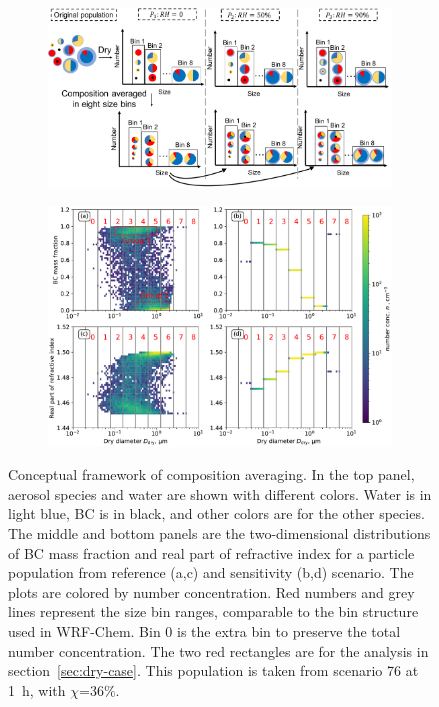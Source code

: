\documentclass[edeposit,fullpage]{uiucthesis2009}
\begin{document}
\begin{figure}
\centering
\begin{subfigure}{0.8\textwidth}
\includegraphics[scale=0.45]{chap4_figs/fig1.pdf}
\end{subfigure}
\begin{subfigure}{0.8\textwidth}
\includegraphics[scale=0.56]{chap4_figs/fig2.pdf}
\end{subfigure}
\caption{Conceptual framework of composition averaging. In the top
  panel, aerosol species and water are shown with different
  colors. Water is in light blue, BC is in black, and other colors are
  for the other species. The middle and bottom panels are the
  two-dimensional distributions of BC mass fraction and real part of
  refractive index for a particle population from reference (a,c) and
  sensitivity (b,d) scenario. The plots are colored by number
  concentration.  Red numbers and grey lines represent the size bin
  ranges, comparable to the bin structure used in WRF-Chem. Bin 0 is
  the extra bin to preserve the total number concentration. The two
  red rectangles are for the analysis in
  section~\ref{sec:dry-case}. This population is taken from scenario
  76 at 1~h, with $\chi$=36\%.}
\label{fig1:scen}
\end{figure}
\end{document}
